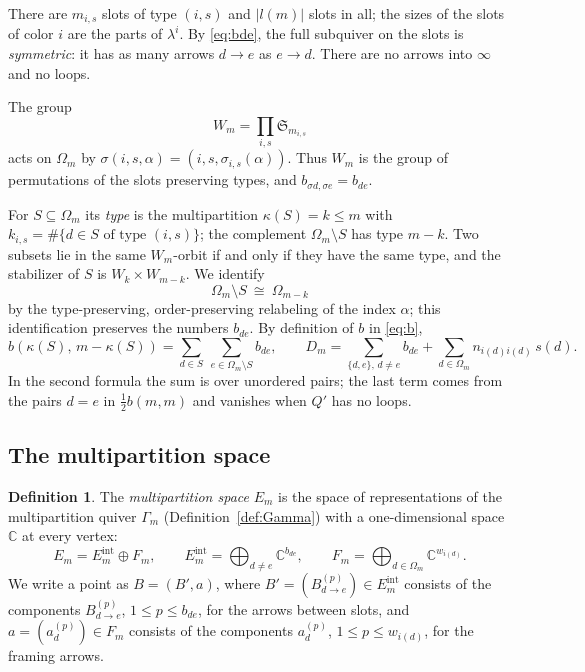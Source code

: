 \documentclass[11pt]{amsart}
\theoremstyle{definition}
\newtheorem{definition}[theorem]{Definition}
\theoremstyle{remark}
\numberwithin{equation}{section}
\newcommand{\C}{\mathbb{C}}
\newcommand{\Om}{\Omega_m}
\begin{document}
There are $m_{i,s}$ slots of type $(i,s)$ and $|l(m)|$ slots in all; the sizes of the slots of color $i$
are the parts of $\lambda^i$. By \eqref{eq:bde}, the full subquiver on the slots is \emph{symmetric}: it
has as many arrows $d\to e$ as $e\to d$. There are no arrows into $\infty$ and no loops.

The group
\begin{equation}\label{eq:Wm}
  W_m=\prod_{i,s}\mathfrak S_{m_{i,s}}
\end{equation}
acts on $\Om$ by $\sigma(i,s,\alpha)=(i,s,\sigma_{i,s}(\alpha))$. Thus $W_m$ is the group of permutations
of the slots preserving types, and $b_{\sigma d,\sigma e}=b_{de}$.

For $S\subseteq\Om$ its \emph{type} is the multipartition $\kappa(S)=k\le m$ with
$k_{i,s}=\#\{d\in S\text{ of type }(i,s)\}$; the complement $\Om\setminus S$ has type $m-k$. Two subsets
lie in the same $W_m$-orbit if and only if they have the same type, and the stabilizer of $S$ is
$W_k\times W_{m-k}$. We identify
\begin{equation}\label{eq:ident}
  \Om\setminus S\ \cong\ \Omega_{m-k}
\end{equation}
by the type-preserving, order-preserving relabeling of the index $\alpha$; this identification preserves
the numbers $b_{de}$. By definition of $b$ in \eqref{eq:b},
\begin{equation}\label{eq:bcross}
  b(\kappa(S),\,m-\kappa(S))=\sum_{d\in S}\ \sum_{e\in\Om\setminus S} b_{de},
  \qquad
  D_m=\sum_{\{d,e\},\,d\neq e} b_{de}+\sum_{d\in\Om} n_{i(d)i(d)}\,s(d).
\end{equation}
In the second formula the sum is over unordered pairs; the last term comes from the pairs $d=e$ in
$\frac12 b(m,m)$ and vanishes when $Q'$ has no loops.

\subsection{The multipartition space}\label{subsec:Em}

\begin{definition}\label{def:Em}
The \emph{multipartition space} $E_m$ is the space of representations of the multipartition quiver
$\Gamma_m$ (Definition~\ref{def:Gamma}) with a one-dimensional space $\C$ at every vertex:
\[
  E_m=E_m^{\mathrm{int}}\oplus F_m,\qquad
  E_m^{\mathrm{int}}=\bigoplus_{d\neq e}\C^{b_{de}},\qquad
  F_m=\bigoplus_{d\in\Om}\C^{w_{i(d)}}.
\]
We write a point as $B=(B',a)$, where $B'=(B^{(p)}_{d\to e})\in E_m^{\mathrm{int}}$ consists of the
components $B^{(p)}_{d\to e}$, $1\le p\le b_{de}$, for the arrows between slots, and
$a=(a^{(p)}_d)\in F_m$ consists of the components $a^{(p)}_d$, $1\le p\le w_{i(d)}$, for the framing
arrows.
\end{definition}
\end{document}
